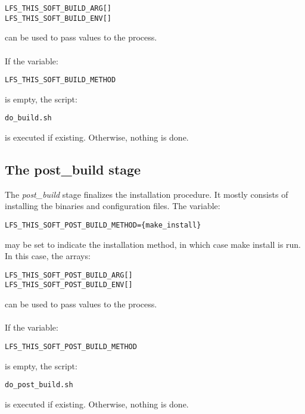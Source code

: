 \documentclass[a4paper, 11pt]{article}
\begin{document}
\begin{lstlisting}[frame=tb]
LFS_THIS_SOFT_BUILD_ARG[]
LFS_THIS_SOFT_BUILD_ENV[]
\end{lstlisting}
can be used to pass values to the process.

\paragraph{}
If the variable:\\

\begin{lstlisting}[frame=tb]
LFS_THIS_SOFT_BUILD_METHOD
\end{lstlisting}
is empty, the script:\\

\begin{lstlisting}[frame=tb]
do_build.sh
\end{lstlisting}
is executed if existing. Otherwise, nothing is done.

\subsection{The post\_build stage}
The \textit{post\_build} stage finalizes the installation procedure. It mostly
consists of installing the binaries and configuration files. The variable:\\

\begin{lstlisting}[frame=tb]
LFS_THIS_SOFT_POST_BUILD_METHOD={make_install}
\end{lstlisting}
may be set to indicate the installation method, in which case make install is
run. In this case, the arrays:\\

\begin{lstlisting}[frame=tb]
LFS_THIS_SOFT_POST_BUILD_ARG[]
LFS_THIS_SOFT_POST_BUILD_ENV[]
\end{lstlisting}
can be used to pass values to the process.

\paragraph{}
If the variable:\\

\begin{lstlisting}[frame=tb]
LFS_THIS_SOFT_POST_BUILD_METHOD
\end{lstlisting}
is empty, the script:\\

\begin{lstlisting}[frame=tb]
do_post_build.sh
\end{lstlisting}
is executed if existing. Otherwise, nothing is done.
\end{document}
